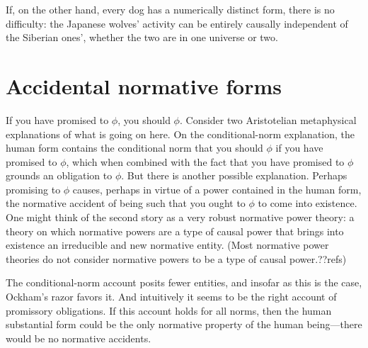 If, on the other hand, every dog has a numerically distinct form,
there is no difficulty: the Japanese wolves' activity can be entirely
causally independent of the Siberian ones', whether the two are in
one universe or two.


\section{Accidental normative forms}
If you have promised to $\phi$, you should $\phi$. Consider two Aristotelian metaphysical explanations of what is going on here.
On the conditional-norm explanation, the human form contains the conditional norm that you should $\phi$ if you have promised 
to $\phi$, which when combined with the fact that you have promised to $\phi$ grounds an obligation to $\phi$. But there is
another possible explanation. Perhaps promising to $\phi$ causes, perhaps in virtue of a power contained in the human form, 
the normative accident of being such that you ought to $\phi$ to come into existence. One might think of the second story as 
a very robust normative power theory: a theory on which normative powers are a type of causal power that brings into existence
an irreducible and new normative entity. (Most normative power theories do not consider normative powers to be a type of 
causal power.??refs) 

The conditional-norm account posits fewer entities, and insofar as this is the case, Ockham's razor favors it. And intuitively
it seems to be the right account of promissory obligations. If this account holds for all norms, then the human substantial form could be 
the only normative property of the human being---there would be no normative accidents.

